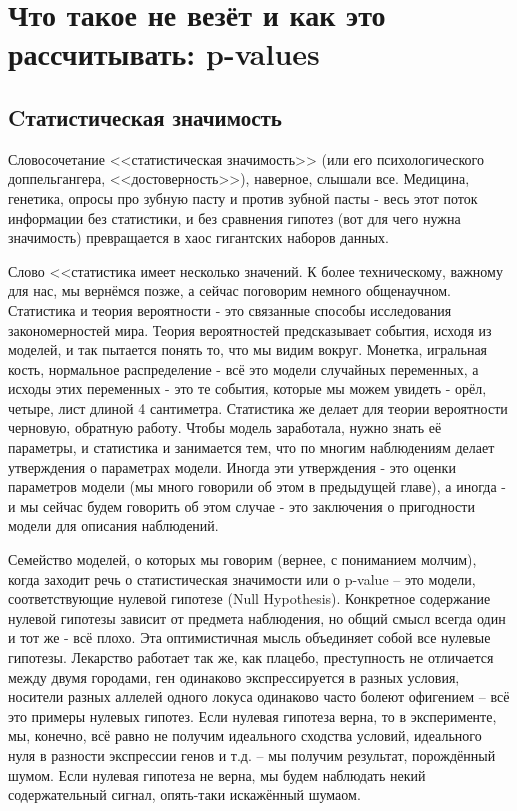 \documentclass{book}
\begin{document}
 

\chapter[Что такое не везёт: p-values]{Что такое не везёт и как это рассчитывать: p-values}

\section*{Cтатистическая значимость}

Словосочетание <<статистическая значимость>> (или его психологического доппельгангера, <<достоверность>>), наверное, слышали все. Медицина, генетика, опросы про зубную пасту и против зубной пасты - весь этот поток информации без статистики, и без сравнения гипотез (вот для чего нужна значимость) превращается в хаос гигантских наборов данных.

Слово <<статистика имеет несколько значений. К более техническому, важному для нас, мы вернёмся позже, а сейчас поговорим немного общенаучном. Статистика и теория вероятности - это связанные способы исследования закономерностей мира. Теория вероятностей предсказывает события, исходя из моделей, и так пытается понять то, что мы видим вокруг. Монетка, игральная кость, нормальное распределение - всё это модели случайных переменных, а исходы этих переменных - это те события, которые мы можем увидеть - орёл, четыре, лист длиной 4 сантиметра. Статистика же делает для теории вероятности черновую, обратную работу. Чтобы модель заработала, нужно знать её параметры, и статистика и занимается тем, что по многим наблюдениям делает утверждения о параметрах модели. Иногда эти утверждения - это оценки параметров модели (мы много говорили об этом в предыдущей главе), а иногда - и мы сейчас будем говорить об этом случае - это заключения о пригодности модели для описания наблюдений.

Семейство моделей, о которых мы говорим (вернее, с пониманием молчим), когда заходит речь о статистическая значимости или о p-value -- это модели, соответствующие нулевой гипотезе (Null Hypothesis). Конкретное содержание нулевой гипотезы зависит от предмета наблюдения, но общий смысл всегда один и тот же - всё плохо. Эта оптимистичная мысль объединяет собой все нулевые гипотезы. Лекарство работает так же, как плацебо, преступность не отличается между двумя городами, ген одинаково экспрессируется в разных условия, носители разных аллелей одного локуса одинаково часто болеют офигением -- всё это примеры нулевых гипотез. Если нулевая гипотеза верна, то в эксперименте, мы, конечно, всё равно не получим идеального сходства условий, идеального нуля в разности экспрессии генов и т.д. -- мы получим результат, порождённый шумом. Если нулевая гипотеза не верна, мы будем наблюдать некий содержательный сигнал, опять-таки искажённый шумаом.
\end{document}
